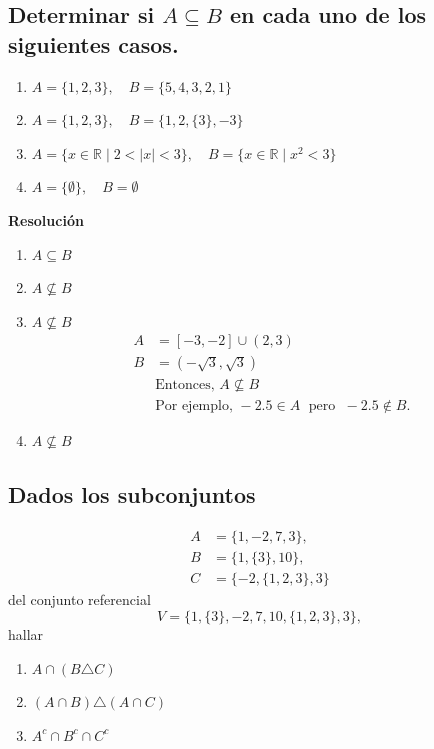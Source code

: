 \documentclass[11pt]{article}
\newcommand{\R}{\mathbb{R}}
\begin{document}
\subsection{Determinar si \(A \subseteq B\) en cada uno de los siguientes casos.}

\begin{enumerate}[label=\roman*)]
    \item \(A = \{1,2,3\}, \quad B = \{5,4,3,2,1\}\)
    \item \(A = \{1,2,3\}, \quad B = \{1,2,\{3\},-3\}\)
    \item \(A = \{x \in \R \mid 2 < |x| < 3\}, \quad B = \{x \in \R \mid x^2 < 3\}\)
    \item \(A = \{\emptyset\}, \quad B = \emptyset\)
\end{enumerate}

\textbf{Resolución}
\begin{enumerate}[label=\roman*)]
    \item \(A \subseteq B\)
    \item \(A \not\subseteq B\)
    \item \(A \not\subseteq B\)
    \begin{align*}
        A &= [-3,-2] \cup (2,3) \\
        B &= (-\sqrt{3}, \sqrt{3}) \\[6pt]
        &\text{Entonces, } A \nsubseteq B \\
        &\text{Por ejemplo, } -2.5 \in A \;\text{ pero }\; -2.5 \notin B.
    \end{align*}
    \item \(A \not\subseteq B\)
\end{enumerate}

\subsection{Dados los subconjuntos}
\begin{align*}
A &= \{1,-2,7,3\}, \\
B &= \{1,\{3\},10\}, \\
C &= \{-2,\{1,2,3\},3\}
\end{align*}
del conjunto referencial
\[
V = \{1,\{3\},-2,7,10,\{1,2,3\},3\},
\]
hallar
\begin{enumerate}[label=\roman*)]
  \item \(A \cap (B \triangle C)\)
  \item \((A \cap B)\triangle (A \cap C)\)
  \item \(A^{c}\cap B^{c}\cap C^{c}\)
\end{enumerate}
\end{document}
